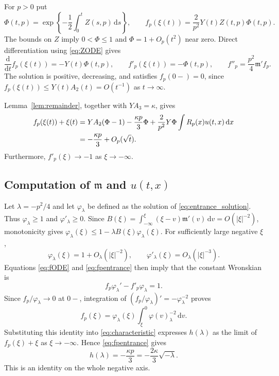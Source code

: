 \documentclass[11pt,letterpaper,reqno]{amsart}
\numberwithin{equation}{section}
\theoremstyle{plain}
\theoremstyle{remark}
\newcommand{\dd}{\,\mathrm d}
\begin{document}
For $p>0$ put
\begin{equation*}
 \Phi(t,p)=\exp\left\{-\frac12\int_0^tZ(s,p)\dd s\right\},\qquad
 f_p(\xi(t))=\frac2{p^2}Y(t)Z(t,p)\Phi(t,p).
\end{equation*}
The bounds on $Z$ imply $0<\Phi\le1$ and $\Phi=1+O_p(t^2)$ near zero. Direct differentiation using \eqref{eq:ZODE} gives
\begin{equation}\label{eq:fODE}
 \frac{\mathrm d}{\mathrm dt}f_p(\xi(t))=-Y(t)\Phi(t,p),\qquad
 f'_p(\xi(t))=-\Phi(t,p),\qquad
 f''_p=\frac{p^2}{4}\mathfrak m'f_p.
\end{equation}
The solution is positive, decreasing, and satisfies $f_p(0-)=0$, since
$f_p(\xi(t))\le Y(t)A_2(t)=O(t^{-1})$ as $t\to\infty$.

Lemma~\ref{lem:remainder}, together with $YA_3=\kappa$, gives
\begin{align}\label{eq:fpentrance}
 f_p(\xi(t))+\xi(t)
 &=YA_2(\Phi-1)-\frac{\kappa p}{3}\Phi
   +\frac2{p^2}Y\Phi\int R_p(x)u(t,x)\dd x\notag\\
 &=-\frac{\kappa p}{3}+O_p(\sqrt t).
\end{align}
Furthermore, $f'_p(\xi)\to-1$ as $\xi\to-\infty$.

\subsection{Computation of \texorpdfstring{$\mathfrak{m}$}{m} and \texorpdfstring{$u(t, x)$}{u(t, x)}}
Let $\lambda = -p^2/4$ and let $\varphi_{\lambda}$ be defined as the solution of \eqref{eq:entrance_solution}. Thus $\varphi_{\lambda} \ge1$ and $\varphi'_{\lambda} \ge0$. Since
$B(\xi)=\int_{-\infty}^\xi(\xi-v)\mathfrak m'(v)\dd v=O(|\xi|^{-2})$, monotonicity gives
$\varphi_{\lambda}(\xi)\le1 - \lambda B(\xi)\varphi_{\lambda}(\xi)$. For sufficiently large negative $\xi$,
\[
 \varphi_{\lambda} (\xi)=1+O_{\lambda} (|\xi|^{-2}),\qquad
 \varphi'_{\lambda} (\xi)=O_{\lambda} (|\xi|^{-3}).
\]
Equations \eqref{eq:fODE} and \eqref{eq:fpentrance} then imply that the constant Wronskian is
\[
 f_p\varphi_{\lambda} '-f'_p\varphi_{\lambda} = 1.
\]
Since $f_p/\varphi_{\lambda} \to0$ at $0-$, integration of $(f_p/\varphi_{\lambda})'=-\varphi^{-2}_{\lambda}$ proves
\[
 f_p(\xi)=\varphi_{\lambda} (\xi)\int_\xi^0\varphi(v)^{-2}_{\lambda} \dd v.
\]
Substituting this identity into \eqref{eq:characteristic} expresses $h(\lambda)$ as the limit of $f_p(\xi)+\xi$ as $\xi\to-\infty$. Hence \eqref{eq:fpentrance} gives
\begin{equation*}
 h(\lambda)=-\frac{\kappa p}{3} = -\frac{2\kappa}{3} \sqrt{-\lambda}.
\end{equation*}
This is an identity on the whole negative axis.
\end{document}
